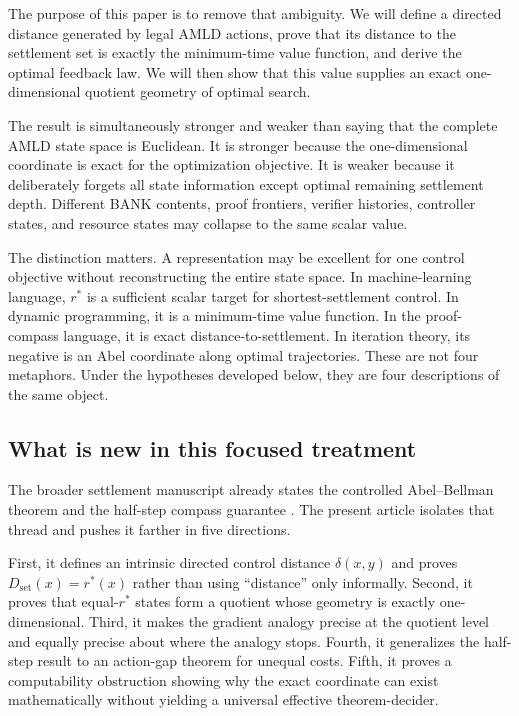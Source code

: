 \documentclass[11pt,letterpaper]{article}
\theoremstyle{remark}
\newcommand{\rstar}{r^{\!*}}
\newcommand{\dset}{D_{\mathrm{set}}}
\begin{document}
The purpose of this paper is to remove that ambiguity. We will define a directed distance generated by legal AMLD actions, prove that its distance to the settlement set is exactly the minimum-time value function, and derive the optimal feedback law. We will then show that this value supplies an exact one-dimensional quotient geometry of optimal search.

The result is simultaneously stronger and weaker than saying that the complete AMLD state space is Euclidean. It is stronger because the one-dimensional coordinate is exact for the optimization objective. It is weaker because it deliberately forgets all state information except optimal remaining settlement depth. Different BANK contents, proof frontiers, verifier histories, controller states, and resource states may collapse to the same scalar value.

The distinction matters. A representation may be excellent for one control objective without reconstructing the entire state space. In machine-learning language, $\rstar$ is a sufficient scalar target for shortest-settlement control. In dynamic programming, it is a minimum-time value function. In the proof-compass language, it is exact distance-to-settlement. In iteration theory, its negative is an Abel coordinate along optimal trajectories. These are not four metaphors. Under the hypotheses developed below, they are four descriptions of the same object.

\subsection{What is new in this focused treatment}

The broader settlement manuscript already states the controlled Abel--Bellman theorem and the half-step compass guarantee \cite{VSS}. The present article isolates that thread and pushes it farther in five directions.

First, it defines an intrinsic directed control distance $\delta(x,y)$ and proves $\dset(x)=\rstar(x)$ rather than using ``distance'' only informally. Second, it proves that equal-$\rstar$ states form a quotient whose geometry is exactly one-dimensional. Third, it makes the gradient analogy precise at the quotient level and equally precise about where the analogy stops. Fourth, it generalizes the half-step result to an action-gap theorem for unequal costs. Fifth, it proves a computability obstruction showing why the exact coordinate can exist mathematically without yielding a universal effective theorem-decider.
\end{document}
